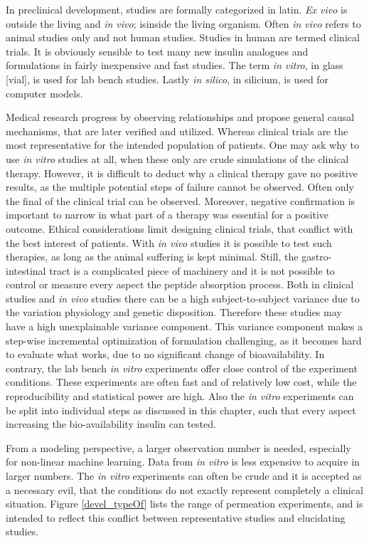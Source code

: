 In preclinical development, studies are formally categorized in latin. \textit{Ex vivo} is outside the living and \textit{in vivo}; isinside the living organism. Often \textit{in vivo} refers to animal studies only and not human studies. Studies in human are termed clinical trials. It is obviously sensible to test many new insulin analogues and formulations in fairly inexpensive and fast studies. The term \textit{in vitro}, in glass [vial], is used for lab bench studies. Lastly \textit{in silico}, in silicium, is used for computer models.
 
Medical research progress by observing relationships and propose general causal mechanisms, that are later verified and utilized. Whereas clinical trials are the most representative for the intended population of patients. One may ask why to use \textit{in vitro} studies at all, when these only are crude simulations of the clinical therapy. However, it is difficult to deduct why a clinical therapy gave no positive results, as the multiple potential steps of failure cannot be observed. Often only the final of the clinical trial can be observed. Moreover, negative confirmation is important to narrow in what part of a therapy was essential for a positive outcome. Ethical considerations limit designing clinical trials, that conflict with the best interest of patients. With \textit{in vivo} studies it is possible to test such therapies, as long as the animal suffering is kept minimal. Still, the gastro-intestinal tract is a complicated piece of machinery and it is not possible to control or measure every aspect the peptide absorption process. Both in clinical studies and \textit{in vivo} studies there can be a high subject-to-subject variance due to the variation physiology and genetic disposition. Therefore these studies may have a high unexplainable variance component. This variance component makes a step-wise incremental optimization of formulation challenging, as it becomes hard to evaluate what works, due to no significant change of bioavailability. In contrary, the lab bench \textit{in vitro} experiments offer close control of the experiment conditions. These experiments are often fast and of relatively low cost, while the reproducibility and statistical power are high. Also the \textit{in vitro} experiments can be split into individual steps as discussed in this chapter, such that every aspect increasing the bio-availability insulin can tested.

From a modeling perspective, a larger observation number is needed, especially for non-linear machine learning. Data from \textit{in vitro} is less expensive to acquire in larger numbers. The \textit{in vitro} experiments can often be crude and it is accepted as a necessary evil, that the conditions do not exactly represent completely a clinical situation. Figure \ref{devel_typeOf} lists the range of permeation experiments, and is intended to reflect this conflict between representative studies and elucidating studies.

